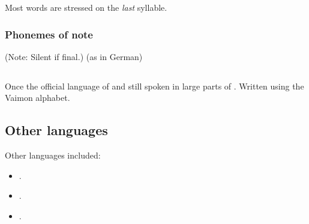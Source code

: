 Most words are stressed on the \emph{last} syllable. 





\begin{pronunciationenvironment}{\subsubsection{Phonemes of note}}
   (Note: Silent if final.)
   (as in German)
\end{pronunciationenvironment}














\subsection{\Velcadian}
Once the official language of  and still spoken in large parts of \Velcad. 
Written using the Vaimon alphabet. 
















\subsection{Other languages}
Other languages included:
\begin{itemize}
  \item {}.
  \item {}.
  \item {}.
\end{itemize}










